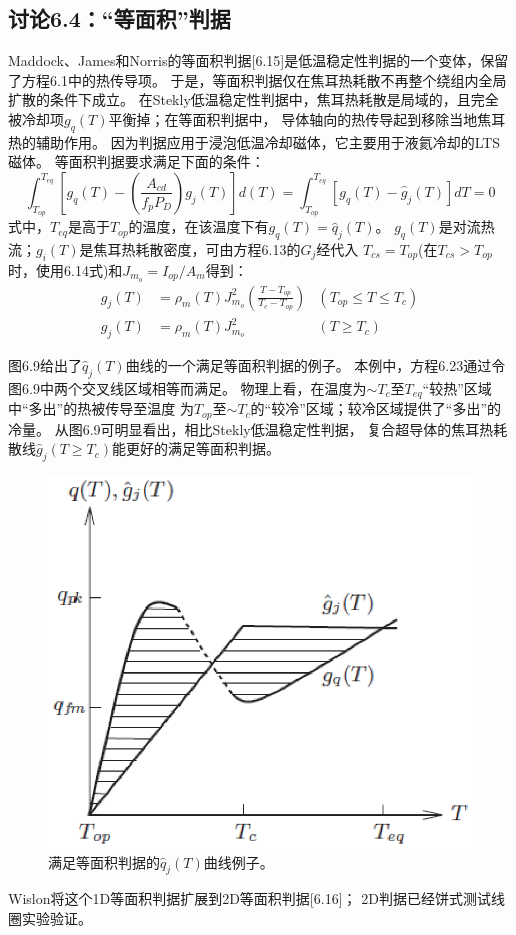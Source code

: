 \subsection{讨论6.4：“等面积”判据}
Maddock、James和Norris的等面积判据[6.15]是低温稳定性判据的一个变体，保留了方程6.1中的热传导项。
于是，等面积判据仅在焦耳热耗散不再整个绕组内全局扩散的条件下成立。
在Stekly低温稳定性判据中，焦耳热耗散是局域的，且完全被冷却项$g_q(T)$平衡掉；在等面积判据中，
导体轴向的热传导起到移除当地焦耳热的辅助作用。
因为判据应用于浸泡低温冷却磁体，它主要用于液氦冷却的LTS磁体。
等面积判据要求满足下面的条件：
\begin{equation}%
\int_{T_{op}}^{T_{eq}}[g_q(T)-(\frac{A_{cd}}{f_pP_D})g_j(T)]d(T)
=\int_{T_{op}}^{T_{eq}}[g_q(T)-\hat{g}_j(T)]dT=0
\end{equation}
式中，$T_{eq}$是高于$T_{op}$的温度，在该温度下有$g_q(T)=\hat{q}_j(T)$。
$g_q(T)$是对流热流；$g_i(T)$是焦耳热耗散密度，可由方程6.13的$G_j$经代入
$T_{cs}=T_{op}$(在$T_{cs}>T_{op}$时，使用6.14式)和$J_{m_o}=I_{op}/A_m$得到：
\begin{subequations}
	\begin{align}
	g_j(T)&=\rho_m(T)J_{m_o}^2(\frac{T-T_{op}}{T_c-T_{op}}) &(T_{op}\leq T \leq T_c)\\
	g_j(T)&=\rho_m(T)J_{m_o}^2 &(T \geq T_c)
	\end{align}
\end{subequations}

图6.9给出了$\hat{q}_j(T)$曲线的一个满足等面积判据的例子。
本例中，方程6.23通过令图6.9中两个交叉线区域相等而满足。
物理上看，在温度为$\sim T_c$至$T_{eq}$“较热”区域中“多出”的热被传导至温度
为$T_{op}$至$\sim T_{c}$的“较冷”区域；较冷区域提供了“多出”的冷量。
从图6.9可明显看出，相比Stekly低温稳定性判据，
复合超导体的焦耳热耗散线$\hat{g}_j(T\ge T_c)$能更好的满足等面积判据。
\begin{figure}[htbp]
	\centering
	\includegraphics[scale=0.7]{chpt6/figs/fig6.9.eps}
	\caption{满足等面积判据的$\hat{q}_j(T)$曲线例子。}
\end{figure}
Wislon将这个1D等面积判据扩展到2D等面积判据[6.16]；
2D判据已经饼式测试线圈实验验证。

